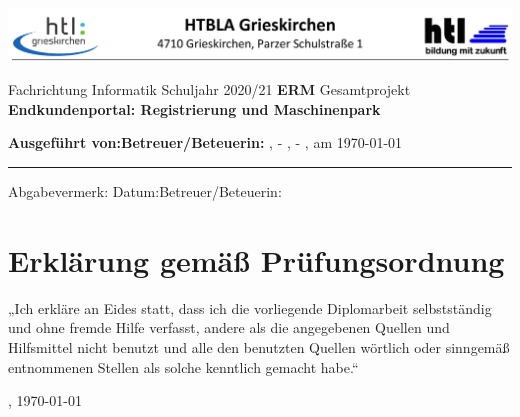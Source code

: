 \newcommand{\IncludeSchoolTemplate}[2]{
	\vspace*{-7em}
	\makebox[\textwidth]{
		\begin{tikzpicture}[
			every node/.style={anchor=north west,inner sep=0pt},
			x=1mm, y=1mm]
			\node (templatepage) at (0,0)
			{\texttt{[image: ./summary.pdf]}};
			#2
		\end{tikzpicture}
	}
	\newpage
}


\includegraphics[width=\textwidth]{./grafiken/school-header.png}
{\centering
	\vskip1cm
	Fachrichtung Informatik
	\vskip2cm
	Schuljahr 2020/21
	\vskip4cm
	\Huge\textbf{ERM}
	\vskip10pt
	\large
	Gesamtprojekt
	\vskip5pt
	\Huge\textbf{Endkundenportal: Registrierung und Maschinenpark}
	\small
	\vskip4cm
	\begin{flushleft}
		\textbf{Ausgeführt von:}\tabto{9cm}\textbf{Betreuer/Beteuerin:}\linebreak
		\ThRealAuthorNameOne, \ThAuthorsClass-\ThAuthorOneNumber\tabto{9cm}\ThSupervisorName\linebreak
		\ThRealAuthorNameTwo, \ThAuthorsClass-\ThAuthorTwoNumber
		\vskip1cm
		\ThPhysicalLocation, am \today
		\vskip1cm
		\hrule
		Abgabevermerk:\linebreak
		Datum:\tabto{10cm}Betreuer/Beteuerin:
	\end{flushleft}
}



\chapter*{\hspace{5pt}Erklärung gemäß Prüfungsordnung}
„Ich erkläre an Eides statt, dass ich die vorliegende Diplomarbeit selbstständig und ohne fremde Hilfe verfasst, andere als die angegebenen Quellen und Hilfsmittel nicht benutzt und alle den benutzten Quellen wörtlich oder sinngemäß entnommenen Stellen als solche kenntlich gemacht habe.“

\ThPhysicalLocation, \today{}


